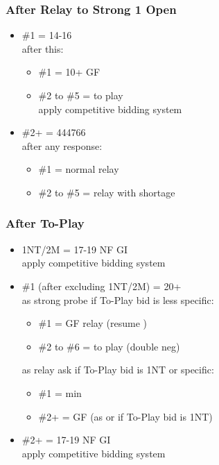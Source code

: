 \documentclass{article}
\begin{document}
\begin{multicols}{2}
\subsubsection{After Relay to Strong 1 Open}
\begin{itemize}
    \setlength\itemsep{-0.2em}
    \item \#1 = 14-16 \\
        after this:
        \begin{itemize}
            \setlength\itemsep{-0.2em}
            \item \#1 = 10+ GF
            \item \#2 to \#5 = to play \\
                apply competitive bidding system
        \end{itemize}
    \item \#2+ = 444766 \\
        after any response:
        \begin{itemize}
            \setlength\itemsep{-0.2em}
            \item \#1 = normal relay
            \item \#2 to \#5 = relay with shortage
        \end{itemize}
\end{itemize}

\subsubsection{After To-Play}
\begin{itemize}
    \setlength\itemsep{-0.2em}
    \item 1NT/2M = 17-19 NF GI \\
        apply competitive bidding system
    \item \#1 (after excluding 1NT/2M) = 20+ \\
        as strong probe if To-Play bid is less specific:
        \begin{itemize}
            \setlength\itemsep{-0.2em}
            \item \#1 = GF relay (resume )
            \item \#2 to \#6 = to play (double neg)
        \end{itemize}
        as relay ask if To-Play bid is 1NT or specific:
        \begin{itemize}
            \setlength\itemsep{-0.2em}
            \item \#1 = min
            \item \#2+ = GF (as  or
                 if To-Play bid is 1NT)
        \end{itemize}
    \item \#2+ = 17-19 NF GI \\
        apply competitive bidding system
\end{itemize}


\end{multicols}
\end{document}
